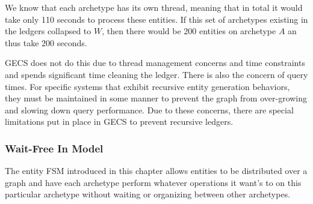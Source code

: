 We know that each archetype has its own thread, meaning that in total it would take only 110 seconds to process these entities. If this set of archetypes existing in the ledgers collapsed to $W$, then there would be 200 entities on archetype $A$ an thus take 200 seconds.

GECS does not do this due to thread management concerns and time constraints and spends significant time cleaning the ledger. There is also the concern of query times. For specific systems that exhibit recursive entity generation behaviors, they must be maintained in some manner to prevent the graph from over-growing and slowing down query performance. Due to these concerns, there are special limitations put in place in GECS to prevent recursive ledgers.

\subsubsection{Wait-Free In Model}
The entity FSM introduced in this chapter allows entities to be distributed over a graph and have each archetype perform whatever operations it want's to on this particular archetype without waiting or organizing between other archetypes. 
